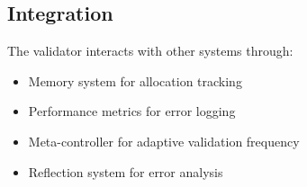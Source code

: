 \documentclass{article}
\begin{document}
\subsection{Integration}
The validator interacts with other systems through:
\begin{itemize}[leftmargin=*]
\item Memory system for allocation tracking
\item Performance metrics for error logging
\item Meta-controller for adaptive validation frequency
\item Reflection system for error analysis
\end{itemize}
\end{document}
